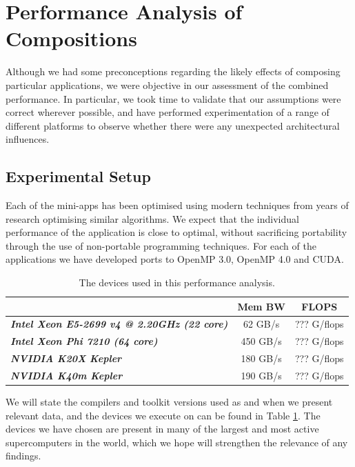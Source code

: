 \documentclass[runningheads,a4paper]{llncs}
\begin{document}
\section{Performance Analysis of Compositions}

Although we had some preconceptions regarding the likely effects of composing particular applications, we were objective in our assessment of the combined performance. In particular, we took time to validate that our assumptions were correct wherever possible, and have performed experimentation of a range of different platforms to observe whether there were any unexpected architectural influences.

\subsection{Experimental Setup}

Each of the mini-apps has been optimised using modern techniques from years of research optimising similar algorithms. We expect that the individual performance of the application is close to optimal, without sacrificing portability through the use of non-portable programming techniques. For each of the applications we have developed ports to OpenMP 3.0, OpenMP 4.0 and CUDA.

\begin{table}[h]
  \begin{center}
    \begin{tabular}{l|c|c}
      \hline
      \textbf{} & \textbf{Mem BW} & \textbf{FLOPS}  \\
      \hline
      \textit{\textbf{Intel Xeon E5-2699 v4 @ 2.20GHz (22 core)}} & 62 GB/s & ??? G/flops \\
      \textit{\textbf{Intel Xeon Phi 7210 (64 core)}} & 450 GB/s & ??? G/flops \\
      \textit{\textbf{NVIDIA K20X Kepler}} & 180 GB/s & ??? G/flops \\
      \textit{\textbf{NVIDIA K40m Kepler}} & 190 GB/s & ??? G/flops \\
    \end{tabular}
  \end{center}
  \caption{The devices used in this performance analysis.}
  \label{tab:hardware}
\end{table}

We will state the compilers and toolkit versions used as and when we present relevant data, and the devices we execute on can be found in Table \ref{tab:hardware}. The devices we have chosen are present in many of the largest and most active supercomputers in the world, which we hope will strengthen the relevance of any findings.
\end{document}
